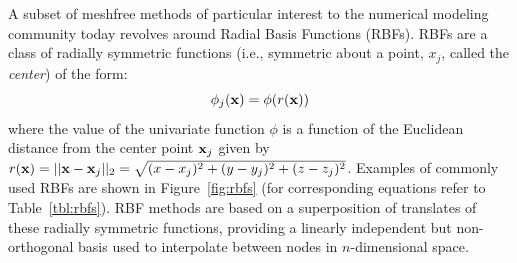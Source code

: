 \documentclass[11pt]{report}
\begin{document}
%

A subset of meshfree methods of particular interest to the
numerical modeling community today revolves around Radial Basis Functions (RBFs).
RBFs are a class of radially symmetric functions (i.e.,
symmetric about a point, $x_j$, called the \emph{center}) of the
form: 
	\begin{equation} 
		\phi_j(\mathbf{x}) = \phi(r(\mathbf{x}))
	\end{equation} 
where the value of the univariate function $\phi$ is a
function of the Euclidean distance from the center point $\mathbf{x}_j$ given by
$r(\mathbf{x}) = ||\mathbf{x}-\mathbf{x}_j||_2 = \sqrt{(x-x_j)^2 + (y-y_j)^2 + (z-z_j)^2}$. Examples of
commonly used RBFs are shown in Figure~\ref{fig:rbfs} (for corresponding equations refer to Table~\ref{tbl:rbfs}). RBF
methods are based on a superposition of translates of these
radially symmetric functions, providing a linearly independent
but non-orthogonal basis used to interpolate between nodes in
$n$-dimensional space. 
\end{document}
